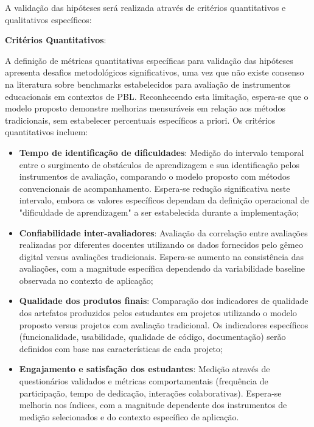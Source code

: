 \documentclass[12pt,a4paper]{article}
\begin{document}
A validação das hipóteses será realizada através de critérios quantitativos e qualitativos específicos:

\textbf{Critérios Quantitativos}:

A definição de métricas quantitativas específicas para validação das hipóteses apresenta desafios metodológicos significativos, uma vez que não existe consenso na literatura sobre benchmarks estabelecidos para avaliação de instrumentos educacionais em contextos de PBL. Reconhecendo esta limitação, espera-se que o modelo proposto demonstre melhorias mensuráveis em relação aos métodos tradicionais, sem estabelecer percentuais específicos a priori. Os critérios quantitativos incluem:

\begin{itemize}
\item \textbf{Tempo de identificação de dificuldades}: Medição do intervalo temporal entre o surgimento de obstáculos de aprendizagem e sua identificação pelos instrumentos de avaliação, comparando o modelo proposto com métodos convencionais de acompanhamento. Espera-se redução significativa neste intervalo, embora os valores específicos dependam da definição operacional de "dificuldade de aprendizagem" a ser estabelecida durante a implementação;

\item \textbf{Confiabilidade inter-avaliadores}: Avaliação da correlação entre avaliações realizadas por diferentes docentes utilizando os dados fornecidos pelo gêmeo digital versus avaliações tradicionais. Espera-se aumento na consistência das avaliações, com a magnitude específica dependendo da variabilidade baseline observada no contexto de aplicação;

\item \textbf{Qualidade dos produtos finais}: Comparação dos indicadores de qualidade dos artefatos produzidos pelos estudantes em projetos utilizando o modelo proposto versus projetos com avaliação tradicional. Os indicadores específicos (funcionalidade, usabilidade, qualidade de código, documentação) serão definidos com base nas características de cada projeto;

\item \textbf{Engajamento e satisfação dos estudantes}: Medição através de questionários validados e métricas comportamentais (frequência de participação, tempo de dedicação, interações colaborativas). Espera-se melhoria nos índices, com a magnitude dependente dos instrumentos de medição selecionados e do contexto específico de aplicação.
\end{itemize}
\end{document}
